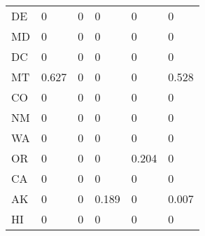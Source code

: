 \begin{table}[ht!]
\begin{tabular}{llllll}
DE          & 0               & 0              & 0               & 0                & 0               \\
MD          & 0               & 0              & 0               & 0                & 0               \\
DC          & 0               & 0              & 0               & 0                & 0               \\
MT          & 0.627           & 0              & 0               & 0                & 0.528           \\
CO          & 0               & 0              & 0               & 0                & 0               \\
NM          & 0               & 0              & 0               & 0                & 0               \\
WA          & 0               & 0              & 0               & 0                & 0               \\
OR          & 0               & 0              & 0               & 0.204            & 0               \\
CA          & 0               & 0              & 0               & 0                & 0               \\
AK          & 0               & 0              & 0.189           & 0                & 0.007           \\
HI          & 0               & 0              & 0               & 0                & 0   \\
\hline
\end{tabular}
\end{table}